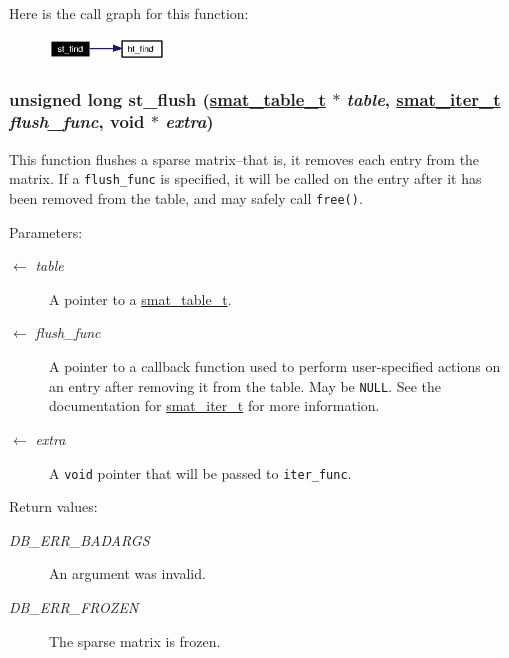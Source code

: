 Here is the call graph for this function:\begin{figure}[H]
\begin{center}
\leavevmode
\includegraphics[width=87pt]{group__dbprim__smat_ga13_cgraph}
\end{center}
\end{figure}
\hypertarget{group__dbprim__smat_ga15}{
\subsubsection[st\_\-flush]{\setlength{\rightskip}{0pt plus 5cm}unsigned long st\_\-flush (\hyperlink{struct__smat__table__s}{smat\_\-table\_\-t} $\ast$ {\em table}, \hyperlink{group__dbprim__smat_ga4}{smat\_\-iter\_\-t} {\em flush\_\-func}, void $\ast$ {\em extra})}}
\label{group__dbprim__smat_ga15}


This function flushes a sparse matrix--that is, it removes each entry from the matrix. If a {\tt flush\_\-func} is specified, it will be called on the entry after it has been removed from the table, and may safely call {\tt free()}.

\begin{Desc}
\item[Parameters:]
\begin{description}
\item[\mbox{$\leftarrow$} {\em table}]A pointer to a \hyperlink{group__dbprim__smat_ga0}{smat\_\-table\_\-t}. \item[\mbox{$\leftarrow$} {\em flush\_\-func}]A pointer to a callback function used to perform user-specified actions on an entry after removing it from the table. May be {\tt NULL}. See the documentation for \hyperlink{group__dbprim__smat_ga4}{smat\_\-iter\_\-t} for more information. \item[\mbox{$\leftarrow$} {\em extra}]A {\tt void} pointer that will be passed to {\tt iter\_\-func}.\end{description}
\end{Desc}
\begin{Desc}
\item[Return values:]
\begin{description}
\item[{\em DB\_\-ERR\_\-BADARGS}]An argument was invalid. \item[{\em DB\_\-ERR\_\-FROZEN}]The sparse matrix is frozen.\end{description}
\end{Desc}


